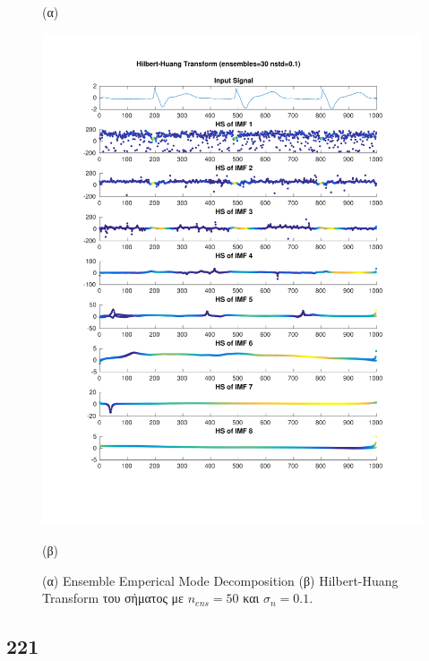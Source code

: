 \documentclass[11pt,a4paper]{article}
\begin{document}
\begin{figure}[H]
\begin{minipage}{0.48\textwidth}
	(α)
\end{minipage}
\begin{minipage}{0.48\textwidth}
	\centering
	\includegraphics[width=\textwidth]{fig/217l1_hht_ensemble.pdf}
	
	(β)
\end{minipage}
\vfill
\caption{(α) Ensemble Emperical Mode Decomposition (β) Hilbert-Huang Transform του σήματος με $n_{ens}=50$ και $\sigma_n = 0.1$.}
\label{fig:217l1_hht_ensemble}
\end{figure}

\subsection*{221}
\end{document}
